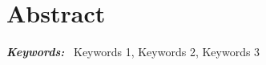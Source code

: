 \chapter*{Abstract}

\lipsum


\vspace*{0.7cm}
\noindent
{\large{\textbf{\emph{Keywords:}}}}~
Keywords 1, Keywords 2, Keywords 3







